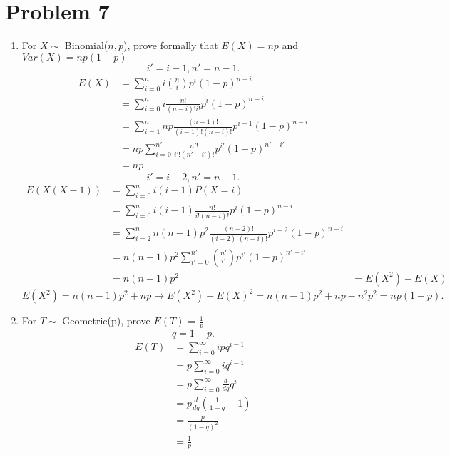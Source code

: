 \documentclass{article}
\begin{document}
\section{Problem 7}
\begin{enumerate}
    \item For $X \sim$ Binomial($n,p$), prove formally  that $E(X) = np$ and $Var(X) = np(1-p)$ 
        \[
        i' = i-1, n' = n-1
        .\] 
        \begin{align*}
            E(X) &= \sum_{i=0}^{n} i \binom{n}{i} p^{i}(1-p)^{n-i} \\
                 &= \sum_{i=0}^{n}i \frac{n!}{(n-i)!i!}p^{i}(1-p)^{n-i}\\
                 &= \sum_{i=1}^{n} np \frac{(n-1)!}{(i-1)!(n-i)!} p^{i-1}(1-p)^{n-i}\\
                 &= np\sum_{i=0}^{n'}\frac{n'!}{i'!(n'-i')!}p^{i'}(1-p)^{n'-i'} \\
                 &= np
        \end{align*}
        \[
        i' = i-2, n' = n-1
        .\] 
        \begin{align*}
            E(X(X-1)) &= \sum_{i=0}^{n}i(i-1)P(X=i) \\
                      &= \sum_{i=0}^{n}i(i-1) \frac{n!}{i!(n-i)!}p^{i}(1-p)^{n-i} \\
                      &= \sum_{i=2}^{n}n(n-1)p^2 \frac{(n-2)!}{(i-2)!(n-i)!}p^{i-2}(1-p)^{n-i} \\
                      &= n(n-1)p^2\sum_{i'=0}^{n'} \binom{n'}{i'}p^{i'}(1-p)^{n'-i'} \\
                      &= n(n-1)p^2
                      &= E(X^2) - E(X)
        \end{align*}
        \[
        E(X^2) = n(n-1)p^2+np \rightarrow E(X^2) - E(X)^2 = n(n-1)p^2+np-n^2p^2 = np(1-p)
        .\]
    \item For $T\sim$ Geometric(p), prove $E(T)$ = $\frac{1}{p}$
        \[
        q = 1-p
        .\] 
        \begin{align*}
            E(T) &= \sum_{i = 0}^{\infty} i pq^{i-1} \\
                 &= p\sum_{i=0}^{\infty}iq^{i-1} \\
                 &= p\sum_{i=0}^{\infty}\frac{d}{dq}q^{i} \\
                 &= p \frac{d}{dq} (\frac{1}{1-q}-1)\\
                 &= \frac{p}{(1-q)^2} \\
                 &= \frac{1}{p}
        \end{align*}
     
\end{enumerate}
\end{document}
